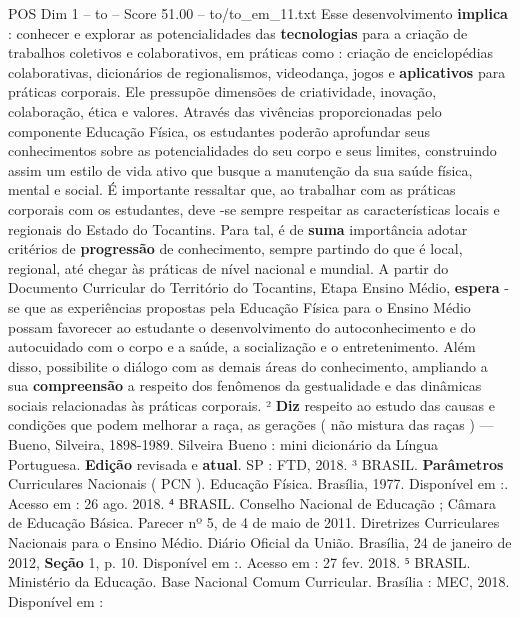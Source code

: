 \begin{textsample}{POS Dim 1 – to – Score 51.00 – to/to\_em\_11.txt}
Esse desenvolvimento \textbf{implica} : conhecer e explorar as potencialidades das \textbf{tecnologias} para a criação de trabalhos coletivos e colaborativos, em práticas como : criação de enciclopédias colaborativas, dicionários de regionalismos, videodança, jogos e \textbf{aplicativos} para práticas corporais.
Ele pressupõe dimensões de criatividade, inovação, colaboração, ética e valores.
Através das vivências proporcionadas pelo componente Educação Física, os estudantes poderão aprofundar seus conhecimentos sobre as potencialidades do seu corpo e seus limites, construindo assim um estilo de vida ativo que busque a manutenção da sua saúde física, mental e social.
É importante ressaltar que, ao trabalhar com as práticas corporais com os estudantes, deve -se sempre respeitar as características locais e regionais do Estado do Tocantins.
Para tal, é de \textbf{suma} importância adotar critérios de \textbf{progressão} de conhecimento, sempre partindo do que é local, regional, até chegar às práticas de nível nacional e mundial.
A partir do Documento Curricular do Território do Tocantins, Etapa Ensino Médio, \textbf{espera} -se que as experiências propostas pela Educação Física para o Ensino Médio possam favorecer ao estudante o desenvolvimento do autoconhecimento e do autocuidado com o corpo e a saúde, a socialização e o entretenimento.
Além disso, possibilite o diálogo com as demais áreas do conhecimento, ampliando a sua \textbf{compreensão} a respeito dos fenômenos da gestualidade e das dinâmicas sociais relacionadas às práticas corporais. ² \textbf{Diz} respeito ao estudo das causas e condições que podem melhorar a raça, as gerações ( não mistura das raças ) — Bueno, Silveira, 1898-1989.
Silveira Bueno : mini dicionário da Língua Portuguesa. \textbf{Edição} revisada e \textbf{atual}.
SP : FTD, 2018. ³ BRASIL. \textbf{Parâmetros} Curriculares Nacionais ( PCN ).
Educação Física.
Brasília, 1977.
Disponível em :.
Acesso em : 26 ago. 2018. ⁴ BRASIL.
Conselho Nacional de Educação ; Câmara de Educação Básica.
Parecer nº 5, de 4 de maio de 2011.
Diretrizes Curriculares Nacionais para o Ensino Médio.
Diário Oficial da União.
Brasília, 24 de janeiro de 2012, \textbf{Seção} 1, p. 10.
Disponível em :.
Acesso em : 27 fev. 2018. ⁵ BRASIL.
Ministério da Educação.
Base Nacional Comum Curricular.
Brasília : MEC, 2018.
Disponível em :

\end{textsample}
